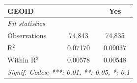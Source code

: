 \begin{tabular}{lcc}
   GEOID                                                               &                & Yes\\  
   \midrule
   \emph{Fit statistics}\\
   Observations                                                        & 74,843         & 74,835\\  
   R$^2$                                                               & 0.07170        & 0.09037\\  
   Within R$^2$                                                        & 0.00578        & 0.00548\\  
   \midrule \midrule
   \multicolumn{3}{l}{\emph{Signif. Codes: ***: 0.01, **: 0.05, *: 0.1}}\\
\end{tabular}
\par\endgroup
\begingroup
\centering
